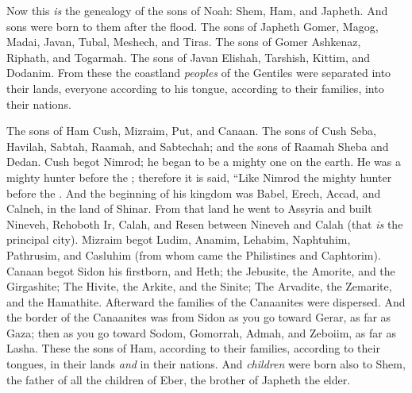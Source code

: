 
\bverse Now this \textit{is} the genealogy of the sons of Noah: Shem, Ham, and Japheth. And sons were born to them after the flood.
\bverse The sons of Japheth \were Gomer, Magog, Madai, Javan, Tubal, Meshech, and Tiras.
\bverse The sons of Gomer \were Ashkenaz, Riphath, and Togarmah.
\bverse The sons of Javan \were Elishah, Tarshish, Kittim, and Dodanim.
\bverse From these the coastland \textit{peoples} of the Gentiles were separated into their lands, everyone according to his tongue, according to their families, into their nations.

\bverse The sons of Ham \were Cush, Mizraim, Put, and Canaan.
\bverse The sons of Cush \were Seba, Havilah, Sabtah, Raamah, and Sabtechah; and the sons of Raamah \were Sheba and Dedan.
\bverse Cush begot Nimrod; he began to be a mighty one on the earth.
\bverse He was a mighty hunter before the \lord; therefore it is said, ``Like Nimrod the mighty hunter before the \lord.
\bverse And the beginning of his kingdom was Babel, Erech, Accad, and Calneh, in the land of Shinar.
\bverse From that land he went to Assyria and built Nineveh, Rehoboth Ir, Calah,
\bverse and Resen between Nineveh and Calah (that \textit{is} the principal city).
\bverse Mizraim begot Ludim, Anamim, Lehabim, Naphtuhim,
\bverse Pathrusim, and Casluhim (from whom came the Philistines and Caphtorim).
\bverse Canaan begot Sidon his firstborn, and Heth;
\bverse the Jebusite, the Amorite, and the Girgashite;
\bverse The Hivite, the Arkite, and the Sinite;
\bverse The Arvadite, the Zemarite, and the Hamathite. Afterward the families of the Canaanites were dispersed.
\bverse And the border of the Canaanites was from Sidon as you go toward Gerar, as far as Gaza; then as you go toward Sodom, Gomorrah, Admah, and Zeboiim, as far as Lasha.
\bverse These \were the sons of Ham, according to their families, according to their tongues, in their lands \textit{and} in their nations.
\bverse And \textit{children} were born also to Shem, the father of all the children of Eber, the brother of Japheth the elder.

